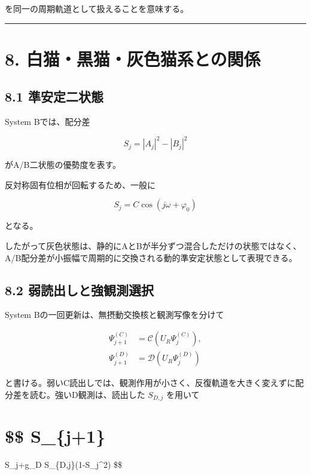 \documentclass[
  a4paper,
  10pt]{article}
\begin{document}
を同一の周期軌道として扱えることを意味する。

\begin{center}\rule{0.5\linewidth}{0.5pt}\end{center}

\section{8.
白猫・黒猫・灰色猫系との関係}\label{8-ux767dux732bux9ed2ux732bux7070ux8272ux732bux7cfbux3068ux306eux95a2ux4fc2}

\subsection{8.1
準安定二状態}\label{81-ux6e96ux5b89ux5b9aux4e8cux72b6ux614b}

System Bでは、配分差

\[
S_j=|A_j|^2-|B_j|^2
\]

がA/B二状態の優勢度を表す。

反対称固有位相が回転するため、一般に

\[
S_j=C\cos(j\omega+\varphi_0)
\]

となる。

したがって灰色状態は、静的にAとBが半分ずつ混合しただけの状態ではなく、A/B配分差が小振幅で周期的に交換される動的準安定状態として表現できる。

\subsection{8.2
弱読出しと強観測選択}\label{82-ux5f31ux8aadux51faux3057ux3068ux5f37ux89b3ux6e2cux9078ux629e}

System Bの一回更新は、無摂動交換核と観測写像を分けて

\[
\begin{aligned}
\Psi_{j+1}^{(C)}
&=\mathcal C\!\left(U_R\Psi_j^{(C)}\right),\\
\Psi_{j+1}^{(D)}
&=\mathcal D\!\left(U_R\Psi_j^{(D)}\right)
\end{aligned}
\]

と書ける。弱いC読出しでは、観測作用が小さく、反復軌道を大きく変えずに配分差を読む。強いD観測は、読出した
\(S_{D,j}\) を用いて

\section{\$\$ S\_\{j+1\}}\label{-s_j1-1}

S\_j+g\_D S\_\{D,j\}(1-S\_j\^{}2) \$\$
\end{document}
